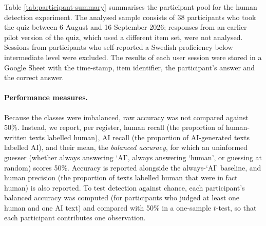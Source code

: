 \documentclass[thesis]{cluu}
\begin{document}
Table \ref{tab:participant-summary} summarises the participant pool for the human detection experiment. The analysed sample consists of 38 participants who took the quiz between 6 August and 16 September 2026; responses from an earlier pilot version of the quiz, which used a different item set, were not analysed.
Sessions from participants who self-reported a Swedish proficiency below intermediate level were excluded.
The results of each user session were stored in a Google Sheet with the time-stamp, item identifier, the participant's answer and the correct answer.

\paragraph{Performance measures.} Because the classes were imbalanced, raw accuracy was not compared against 50\%. Instead, we report, per register, human recall (the proportion of human-written texts labelled human), AI recall (the proportion of AI-generated texts labelled AI), and their mean, the \emph{balanced accuracy}, for which an uninformed guesser (whether always answering `AI', always answering `human', or guessing at random) scores 50\%. Accuracy is reported alongside the always-`AI' baseline, and human precision (the proportion of texts labelled human that were in fact human) is also reported. To test detection against chance, each participant's balanced accuracy was computed (for participants who judged at least one human and one AI text) and compared with 50\% in a one-sample $t$-test, so that each participant contributes one observation.
\end{document}
